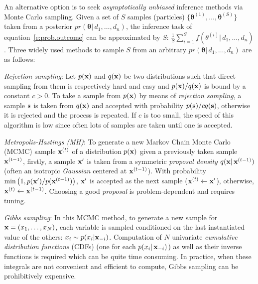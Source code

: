 An alternative option is to seek \emph{asymptotically unbiased} inference methods
via Monte Carlo sampling.
Given a set of $S$ samples (particles) $\{\boldsymbol\theta^{(1)}, \ldots, \boldsymbol\theta^{(S)}\}$ taken from a posterior $pr(\boldsymbol\theta | \, d_1, \ldots, d_n)$, 
the inference task of equation~\ref{e:prob.outcome} can be approximated by $S$: 
$\frac{1}{S} \sum_{i=1}^S f(\theta^{(i)} | \, d_1, \ldots, d_n)$.
Three widely used methods to sample $S$ from an arbitrary $pr(\boldsymbol\theta | \, d_1, \ldots, d_n)$ are as follows:

\emph{Rejection sampling}:
Let $p(\textbf{x})$ and $q(\textbf{x})$ be two distributions 
such that direct sampling from them is respectively hard and easy
and
$p(\textbf{x})/q(\textbf{x})$ is bound by a constant $c>0$. 
To take a sample from $p(\textbf{x})$ by means of \emph{rejection sampling}, 
a sample $\textbf{s}$ is taken from $q(\textbf{x})$ and accepted with probability $p(\textbf{s}) / c q(\textbf{s})$, 
otherwise it is rejected and the process is repeated. 
If $c$ is too small, the speed of this algorithm is low since often lots of samples are taken until one is accepted.

\emph{Metropolis-Hastings (MH)}:
To generate a new Markov Chain Monte Carlo (MCMC) sample $\textbf{x}^{(t)}$ of a distribution $p(\textbf{x})$ given a previously taken sample $\textbf{x}^{(t-1)}$, 
firstly, a sample $\textbf{x}'$ is taken 
from a symmetric \emph{proposal density} $q(\textbf{x} |\, \textbf{x}^{(t-1)})$ 
(often an isotropic \emph{Gaussian} centered at $\textbf{x}^{(t-1)}$). 
With probability $\min \big(1, p(\textbf{x}')/p(\textbf{x}^{(t-1)}) \big)$, 
$\textbf{x}'$ is accepted as the next sample ($\textbf{x}^{(t)} \leftarrow \textbf{x}'$), otherwise, $\textbf{x}^{(t)} \leftarrow \textbf{x}^{(t-1)}$. 
Choosing a good \emph{proposal} is problem-dependent and requires tuning. 


\emph{Gibbs sampling}:
In this MCMC method, to generate a new sample for $\textbf{x} = (x_1, \ldots, x_N)$, 
each variable is sampled conditioned on the last instantiated value of the others:
$x_i \sim p(x_i | \textbf{x}_{-i})$. 
Computation of $N$ univariate \emph{cumulative distribution functions} (CDFs) 
(one for each $p(x_i | \, \textbf{x}_{-i})$) as well as their inverse functions is required which can be quite time consuming. 
In practice, when these integrals are not convenient and efficient to compute, Gibbs sampling can be prohibitively expensive.   

